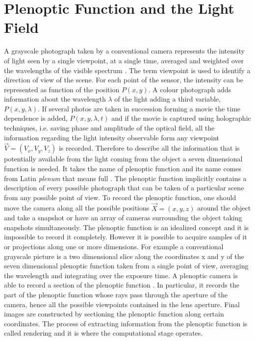 \section{Plenoptic Function and the Light Field}
\label{sec:lightfield}
A grayscale photograph taken by a conventional camera represents the intensity of light seen by a single viewpoint, at a single time, averaged and weighted over the wavelengths of the visible spectrum \cite{adelson1991plenoptic}. The term viewpoint is used to identify a direction of view of the scene. For each point of the sensor, the intensity can be represented as function of the position $P(x,y)$. A colour photograph adds information about the wavelength $\lambda$ of the light adding a third variable, $P(x,y,\lambda)$. If several photos are taken in succession forming a movie the time dependence is added, $P(x,y,\lambda,t)$ and if the movie is captured using holographic techniques, i.e. saving phase and amplitude of the optical field, all the information regarding the light intensity observable form any viewpoint $\overrightarrow{V} = (V_x, V_y, V_z)$ is recorded. Therefore to describe all the information that is potentially available from the light coming from the object a seven dimensional function is needed. It takes the name of plenoptic function and its name comes from Latin \textit{plenum} that means full \cite{adelson1992single, adelson1991plenoptic,wetzstein2011computational}. The plenoptic function implicitly contains a description of every possible photograph that can be taken of a particular scene from any possible point of view. To record the plenoptic function, one should move the camera along all the possible positions $\overrightarrow{X}=(x, y, z)$ around the object and take a snapshot or have an array of cameras surrounding the object taking snapshots simultaneously. The plenoptic function is an idealized concept and it is impossible to record it completely. However it is possible to acquire samples of it or projections along one or more dimensions. For example a conventional grayscale picture is a two dimensional slice along the coordinates x and y of the seven dimensional plenoptic function taken from a single point of view, averaging the wavelength and integrating over the exposure time. A plenoptic camera is able to record a section of the plenoptic function \cite{adelson1991plenoptic}. In particular, it records the part of the plenoptic function whose rays pass through the aperture of the camera, hence all the possible viewpoints contained in the lens aperture. Final images are constructed by sectioning the plenoptic function along certain coordinates. The process of extracting information from the plenoptic function is called rendering \cite{levoy1996light,georgiev2010focused} and it is where the computational stage operates. 
